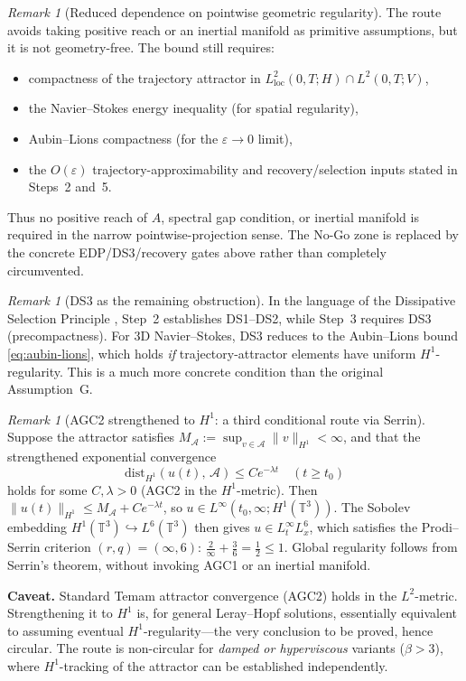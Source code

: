 \documentclass[12pt,a4paper]{article}
\theoremstyle{definition}
\theoremstyle{plain}
\theoremstyle{remark}
\newtheorem{remark}[definition]{Remark}
\begin{document}
\begin{remark}[Reduced dependence on pointwise geometric regularity]\label{rem:no-reach-needed}
The route avoids taking positive reach or an inertial manifold as primitive assumptions, but it is not geometry-free.  The bound still requires:
\begin{itemize}
\item compactness of the trajectory attractor in $L^2_{\mathrm{loc}}(0,T;H) \cap L^2(0,T;V)$,
\item the Navier--Stokes energy inequality (for spatial regularity),
\item Aubin--Lions compactness (for the $\varepsilon \to 0$ limit),
\item the $O(\varepsilon)$ trajectory-approximability and recovery/selection inputs stated in Steps~2 and~5.
\end{itemize}
Thus no positive reach of $A$, spectral gap condition, or inertial manifold is required in the narrow pointwise-projection sense.  The No-Go zone is replaced by the concrete EDP/DS3/recovery gates above rather than completely circumvented.
\end{remark}

\begin{remark}[DS3 as the remaining obstruction]\label{rem:ds3-ns}
In the language of the Dissipative Selection Principle \cite{FST-Unified2026}, Step~2 establishes DS1--DS2, while Step~3 requires DS3 (precompactness). For 3D Navier--Stokes, DS3 reduces to the Aubin--Lions bound \eqref{eq:aubin-lions}, which holds \emph{if} trajectory-attractor elements have uniform $H^1$-regularity. This is a much more concrete condition than the original Assumption~G.
\end{remark}

\begin{remark}[AGC2 strengthened to $H^1$: a third conditional route via Serrin]\label{rem:agc2-H1-serrin}
Suppose the attractor satisfies $M_{\mathcal{A}} := \sup_{v \in \mathcal{A}} \|v\|_{H^1} < \infty$, and that the strengthened exponential convergence
\[
  \mathrm{dist}_{H^1}(u(t),\,\mathcal{A}) \leq C e^{-\lambda t} \quad (t \geq t_0)
\]
holds for some $C, \lambda > 0$ \textup{(AGC2 in the $H^1$-metric)}.  Then $\|u(t)\|_{H^1} \leq M_{\mathcal{A}} + C e^{-\lambda t}$, so $u \in L^\infty(t_0,\infty; H^1(\mathbb{T}^3))$.  The Sobolev embedding $H^1(\mathbb{T}^3) \hookrightarrow L^6(\mathbb{T}^3)$ then gives $u \in L^\infty_t L^6_x$, which satisfies the Prodi--Serrin criterion $(r,q) = (\infty,6)$: $\tfrac{2}{\infty} + \tfrac{3}{6} = \tfrac{1}{2} \leq 1$.  Global regularity follows from Serrin's theorem, without invoking AGC1 or an inertial manifold.

\medskip\noindent
\textbf{Caveat.}  Standard Temam attractor convergence (AGC2) holds in the $L^2$-metric.  Strengthening it to $H^1$ is, for general Leray--Hopf solutions, essentially equivalent to assuming eventual $H^1$-regularity---the very conclusion to be proved, hence circular.  The route is non-circular for \emph{damped or hyperviscous} variants ($\beta > 3$), where $H^1$-tracking of the attractor can be established independently.
\end{remark}
\end{document}
